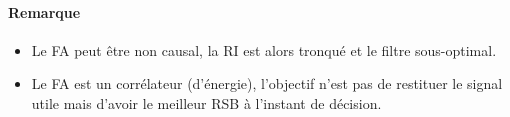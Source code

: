 \documentclass[main.tex]{subfiles}
\begin{document}
\paragraph{Remarque}
\begin{itemize}
\item Le FA peut être non causal, la RI est alors tronqué et le filtre
  sous-optimal.
\item Le FA est un corrélateur (d'énergie), l'objectif n'est pas de restituer le signal utile mais d'avoir le meilleur RSB à l'instant de décision.
\end{itemize}
\end{document}
